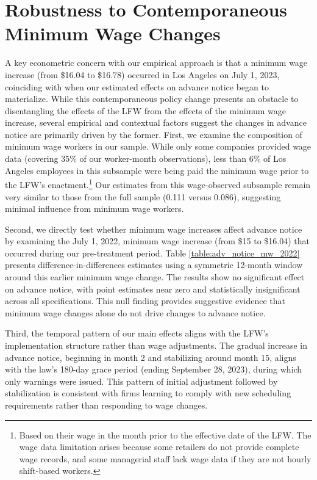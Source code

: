 \documentclass[letterpaper,11pt,leqno]{article}
\theoremstyle{paper}
\begin{document}
\newpage

\section{Robustness to Contemporaneous Minimum Wage Changes} \label{sec:min_wage_changes}

A key econometric concern with our empirical approach is that a minimum wage increase (from \$16.04 to \$16.78) occurred in Los Angeles on July 1, 2023, coinciding with when our estimated effects on advance notice began to materialize. While this contemporaneous policy change presents an obstacle to disentangling the effects of the LFW from the effects of the minimum wage increase, several empirical and contextual factors suggest the changes in advance notice are primarily driven by the former. 
First, we examine the composition of minimum wage workers in our sample. While only some companies provided wage data (covering 35\% of our worker-month observations), less than 6\% of Los Angeles employees in this subsample were being paid the minimum wage prior to the LFW's enactment.\footnote{Based on their wage in the month prior to the effective date of the LFW. The wage data limitation arises because some retailers do not provide complete wage records, and some managerial staff lack wage data if they are not hourly shift-based workers.} Our estimates from this wage-observed subsample remain very similar to those from the full sample (0.111 versus 0.086), suggesting minimal influence from minimum wage workers.

Second, we directly test whether minimum wage increases affect advance notice by examining the July 1, 2022, minimum wage increase (from \$15 to \$16.04) that occurred during our pre-treatment period. Table \ref{table:adv_notice_mw_2022} presents difference-in-differences estimates using a symmetric 12-month window around this earlier minimum wage change. The results show no significant effect on advance notice, with point estimates near zero and statistically insignificant across all specifications. This null finding provides suggestive evidence that minimum wage changes alone do not drive changes to advance notice.

Third, the temporal pattern of our main effects aligns with the LFW's implementation structure rather than wage adjustments. The gradual increase in advance notice, beginning in month 2 and stabilizing around month 15, aligns with the law's 180-day grace period (ending September 28, 2023), during which only warnings were issued. This pattern of initial adjustment followed by stabilization is consistent with firms learning to comply with new scheduling requirements rather than responding to wage changes.
\end{document}
